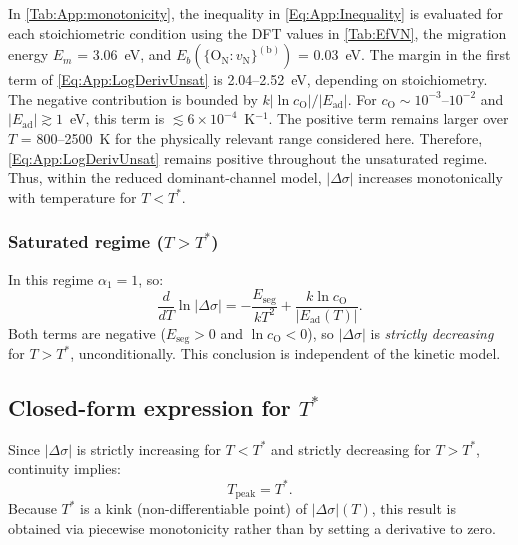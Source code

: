 \documentclass[preprint,12pt,sort&compress]{elsarticle}
\newcommand{\?}{\stackrel{?}{=}}
\begin{document}
In \cref{Tab:App:monotonicity}, the inequality in \cref{Eq:App:Inequality} is evaluated for each stoichiometric condition using the DFT values in \cref{Tab:EfVN}, the migration energy $E_m$ = 3.06~eV, and $E_b(\{\text{O}_\text{N}:v_\text{N}\}^{(\text{b})})$ = 0.03~eV. The margin in the first term of \cref{Eq:App:LogDerivUnsat} is 2.04--2.52~eV, depending on stoichiometry. The negative contribution is bounded by $k|\ln c_\text{O}|/|E_\text{ad}|$. For $c_\text{O}\sim10^{-3}$--$10^{-2}$ and $|E_\text{ad}|\gtrsim1$~eV, this term is $\lesssim 6\times10^{-4}$~K$^{-1}$. The positive term remains larger over $T$ = 800--2500~K for the physically relevant range considered here. Therefore, \cref{Eq:App:LogDerivUnsat} remains positive throughout the unsaturated regime. Thus, within the reduced dominant-channel model, $|\Delta\sigma|$ increases monotonically with temperature for $T<T^*$.

\subsubsection{Saturated regime (\texorpdfstring{$T > T^*$}{T > T*})}

In this regime $\alpha_1 = 1$, so:
\begin{equation}
\frac{d}{dT}\ln|\Delta \sigma| = -\frac{E_\text{seg}}{kT^2} + \frac{k\ln c_\text{O}}{|E_\text{ad}(T)|}.
\label{Eq:App:LogDerivSat}
\end{equation}
Both terms are negative ($E_\text{seg} > 0$ and $\ln c_\text{O} < 0$), so $|\Delta \sigma|$ is \emph{strictly decreasing} for $T > T^*$, unconditionally. This conclusion is independent of the kinetic model.

\subsection{Closed-form expression for \texorpdfstring{$T^*$}{T*}}
\label{App:Tpeak:Formula}

Since $|\Delta \sigma|$ is strictly increasing for $T < T^*$ and strictly decreasing for $T > T^*$, continuity implies:
\begin{equation}
T_\text{peak} = T^*.
\label{Eq:App:TpeakIsTstar}
\end{equation}
Because $T^*$ is a kink (non-differentiable point) of $|\Delta \sigma|(T)$, this result is obtained via piecewise monotonicity rather than by setting a derivative to zero.
\end{document}
